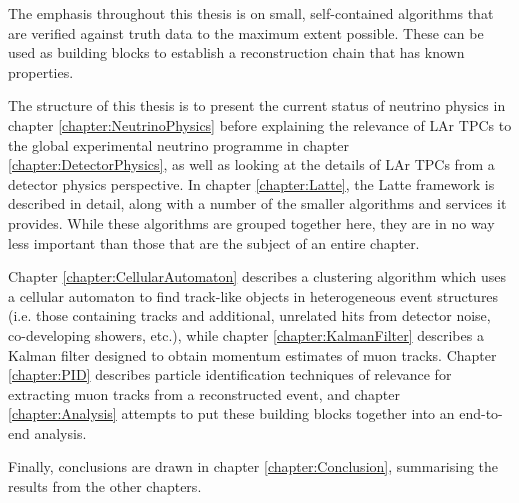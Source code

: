 The emphasis throughout this thesis is on small, self-contained algorithms that are verified against truth data to the maximum extent possible. These can be used as building blocks to establish a reconstruction chain that has known properties.

The structure of this thesis is to present the current status of neutrino physics in chapter \ref{chapter:NeutrinoPhysics} before explaining the relevance of \ac{LAr TPC}s to the global experimental neutrino programme in chapter \ref{chapter:DetectorPhysics}, as well as looking at the details of \ac{LAr TPC}s from a detector physics perspective. In chapter \ref{chapter:Latte}, the Latte framework is described in detail, along with a number of the smaller algorithms and services it provides. While these algorithms are grouped together here, they are in no way less important than those that are the subject of an entire chapter.

Chapter \ref{chapter:CellularAutomaton} describes a clustering algorithm which uses a cellular automaton to find track-like objects in heterogeneous event structures (i.e. those containing tracks and additional, unrelated hits from detector noise, co-developing showers, etc.), while chapter \ref{chapter:KalmanFilter} describes a Kalman filter designed to obtain momentum estimates of muon tracks. Chapter \ref{chapter:PID} describes particle identification techniques of relevance for extracting muon tracks from a reconstructed event, and chapter \ref{chapter:Analysis} attempts to put these building blocks together into an end-to-end analysis.

Finally, conclusions are drawn in chapter \ref{chapter:Conclusion}, summarising the results from the other chapters.
